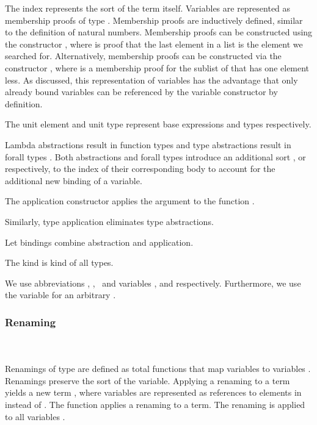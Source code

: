 \noindent The index  represents the sort of the term itself.
\FTerm
Variables   are represented as membership proofs of type   .
Membership proofs are inductively defined, similar to the definition of natural numbers. 
Membership proofs can be constructed using the constructor , where  is proof that the last element in a list  is the element we searched for. 
Alternatively, membership proofs can be constructed via the constructor  , where  is a membership proof for the sublist  of  that has one element less. 
As discussed, this representation of variables has the advantage that only already bound variables can be referenced by the variable constructor by definition. 

\noindent The unit element  and unit type  represent base expressions and types respectively. 

\noindent Lambda abstractions   result in function types    and type abstractions   result in forall types  . 
Both abstractions and forall types introduce an additional sort , or  respectively, to the index  of their corresponding body to account for the additional new binding of a variable.

\noindent The application constructor    applies the argument  to the function .

\noindent Similarly, type application    eliminates type abstractions. 

\noindent Let bindings     combine abstraction and application. 

\noindent The kind  is kind of all types.

\noindent We use abbreviations \FVar, \FExpr, \FType\ and variables ,  and  respectively. Furthermore, we use the variable  for an arbitrary   .

\subsubsection{Renaming}\hfill\\\\
Renamings  of type    are defined as total functions that map variables    to variables   . 
Renamings preserve the sort  of the variable.
\FRen
Applying a renaming    to a term    yields a new term   , where variables are represented as references to elements in  instead of . The function  applies a renaming to a term.
\Fren
The renaming is applied to all variables .

